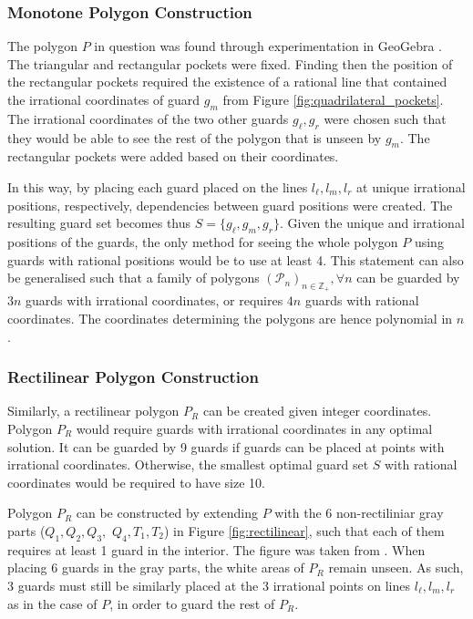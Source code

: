 \subsubsection{Monotone Polygon Construction}
The polygon $P$ in question  was found through experimentation in GeoGebra \cite{geogebra}. The triangular and rectangular pockets were fixed. Finding then the position of the rectangular pockets required the existence of a rational line that contained the irrational coordinates of guard $g_m$ from Figure \ref{fig:quadrilateral_pockets}. The irrational coordinates of the two other guards $g_\ell, g_r$ were chosen such that they would be able to see the rest of the polygon that is unseen by $g_m$. The rectangular pockets were added based on their coordinates.

In this way, by placing each guard placed on the lines $l_\ell, l_m, l_r$ at unique irrational positions, respectively, dependencies between guard positions were created. The resulting guard set becomes thus $S = \{g_\ell, g_m, g_r\}$.  Given the unique and irrational positions of the guards, the only method for seeing the whole polygon $P$ using guards with rational positions would be to use at least 4. This statement can also be generalised such that a family of polygons $(\mathcal{P}_n)_{n \in \mathbb{Z}_+}, \forall n$ can be guarded by $3n$ guards with irrational coordinates, or requires $4n$ guards with rational coordinates. The coordinates determining the polygons are hence polynomial in $n$.

\subsubsection{Rectilinear Polygon Construction}
Similarly, a rectilinear polygon $P_R$ can be created given integer coordinates. Polygon $P_R$ would require guards with irrational coordinates in any optimal solution. It can be guarded by 9 guards if guards can be placed at points with irrational coordinates. Otherwise, the smallest optimal guard set $S$ with rational coordinates would be required to have size 10.

Polygon $P_R$ can be constructed by extending $P$ with the 6 non-rectiliniar gray parts ($Q_1, Q_2, Q_3,$ $Q_4, T_1, T_2$) in Figure \ref{fig:rectilinear}, such that each of them requires at least 1 guard in the interior. The figure was taken from \cite{1057165}. When placing 6 guards in the gray parts, the white areas of $P_R$ remain unseen. As such, 3 guards must still be similarly placed at the 3 irrational points on lines $l_\ell, l_m, l_r$ as in the case of $P$, in order to guard the rest of $P_R$.


